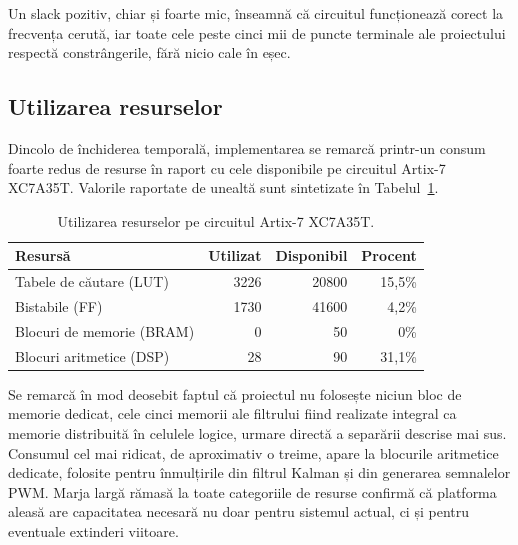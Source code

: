 Un slack pozitiv, chiar și foarte mic, înseamnă că circuitul funcționează corect la
frecvența cerută, iar toate cele peste cinci mii de puncte terminale ale proiectului
respectă constrângerile, fără nicio cale în eșec.

\subsection{Utilizarea resurselor}

Dincolo de închiderea temporală, implementarea se remarcă printr-un consum foarte
redus de resurse în raport cu cele disponibile pe circuitul Artix-7 XC7A35T. Valorile
raportate de unealtă sunt sintetizate în Tabelul~\ref{tab:utilizare}.

\begin{table}[H]
\centering
\caption{Utilizarea resurselor pe circuitul Artix-7 XC7A35T.}
\label{tab:utilizare}
\begin{tabular}{l r r r}
\toprule
\textbf{Resursă} & \textbf{Utilizat} & \textbf{Disponibil} & \textbf{Procent} \\
\midrule
Tabele de căutare (LUT) & 3226 & 20800 & 15,5\% \\
Bistabile (FF) & 1730 & 41600 & 4,2\% \\
Blocuri de memorie (BRAM) & 0 & 50 & 0\% \\
Blocuri aritmetice (DSP) & 28 & 90 & 31,1\% \\
\bottomrule
\end{tabular}
\end{table}

Se remarcă în mod deosebit faptul că proiectul nu folosește niciun bloc de memorie
dedicat, cele cinci memorii ale filtrului fiind realizate integral ca memorie
distribuită în celulele logice, urmare directă a separării descrise mai sus. Consumul
cel mai ridicat, de aproximativ o treime, apare la blocurile aritmetice dedicate,
folosite pentru înmulțirile din filtrul Kalman și din generarea semnalelor PWM.
Marja largă rămasă la toate categoriile de resurse confirmă că platforma aleasă are
capacitatea necesară nu doar pentru sistemul actual, ci și pentru eventuale extinderi
viitoare.

